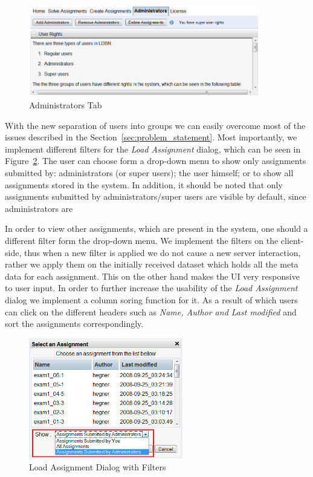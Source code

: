 \begin{figure}[h]
	\begin{center}
		\includegraphics[width=0.9\textwidth]{./img/admin-ui.png}
		\caption{Administrators Tab}
		\label{fig:admin-ui}
	\end{center}
\end{figure}

With the new separation of users into groups we can easily overcome most of 
the issues described in the Section~\ref{sec:problem_statement}.
Most importantly, we implement different filters for the \emph{Load Assignment} dialog,
which can be seen in Figure~\ref{fig:load-assg}. The user can choose form 
a drop-down menu to show only assignments submitted by: administrators 
(or super users); the user himself; or to show all assignments stored in the system. 
In addition, it should be noted that only assignments submitted
by administrators/super users are visible by default, since administrators are

In order to view other assignments, which are present in the system, 
one should a different filter form the drop-down menu. 
We implement the filters on the client-side, thus when a new filter is
applied we do not cause a new server interaction, rather we apply them
on the initially received dataset which holds all the meta data for each assignment.
This on the other hand makes the UI very responsive to user input. 
In order to further increase the usability of the \emph{Load Assignment} dialog
we implement a column soring function for it. As a result of which users can click on
the different headers such as \emph{Name, Author and Last modified} and sort the 
assignments correspondingly. 

\begin{figure}[h]
	\begin{center}
		\includegraphics[width=0.6\textwidth]{./img/load-assg.png}
		\caption{Load Assignment Dialog with Filters}
		\label{fig:load-assg}
	\end{center}
\end{figure}


